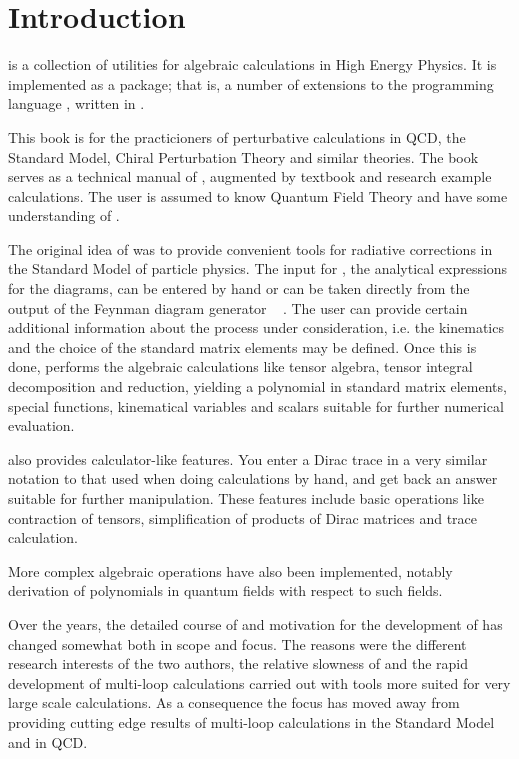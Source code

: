 \section{Introduction}

\fc is a collection of utilities for algebraic calculations in 
High Energy Physics. It is implemented as a \mma package; that is,
a number of extensions to the programming language \mma,
written in \mma. 

This book is for the practicioners of perturbative calculations in QCD, the Standard Model,
Chiral Perturbation Theory and similar theories.
The book serves as a technical manual of \fc, augmented by textbook and research example calculations.
The user is assumed to know Quantum Field Theory and have some understanding of \mma.

The original idea of \fc was to provide convenient tools 
for radiative corrections in the Standard Model of particle physics. 
The input for \fc, the analytical expressions for the diagrams, can be 
entered by hand or can be taken directly from the output of the Feynman diagram generator \fa\ \cite{feynarts} .
The user can provide certain additional  information about the process 
under consideration, i.e. the kinematics and the choice of the standard 
matrix elements may be defined. Once this is done, \fc performs the 
algebraic calculations like tensor algebra, tensor integral decomposition and reduction,
yielding a polynomial in standard matrix elements,  special functions, kinematical 
variables and scalars suitable for further numerical evaluation.

\fc also provides calculator-like features. You enter a Dirac trace 
in a very similar notation to that used when doing calculations by hand, and 
get back an answer suitable 
for further manipulation. These features include basic operations like contraction of
tensors, simplification of products of Dirac matrices and trace calculation.

More complex algebraic operations have also been implemented, notably derivation
of polynomials in quantum fields with respect to such fields.

Over the years, the detailed course of and motivation for the development of \fc has
changed somewhat both in scope and focus. The reasons were  the different research
interests of the two authors, the relative slowness of \mma and the rapid development of
multi-loop calculations carried out with tools \cite{form, formcalc} more suited 
for very large scale calculations.
As a consequence the focus has moved away from providing cutting edge results of multi-loop calculations
in the Standard Model and in QCD. 

